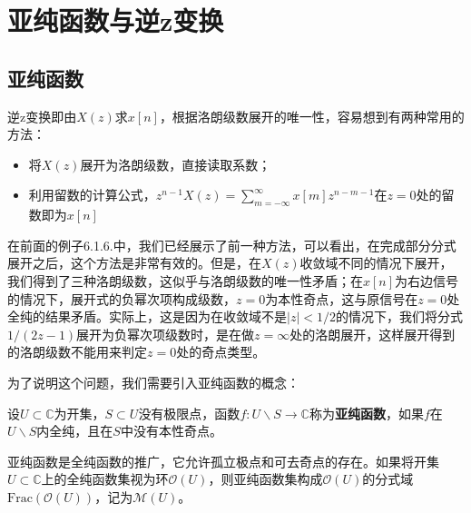 \section{亚纯函数与逆z变换}\label{sec:Inverse_z_Transform}

\subsection{亚纯函数}\label{sub:meromorphic_function}
逆z变换即由$X(z)$求$x[n]$，根据洛朗级数展开的唯一性，容易想到有两种常用的方法：
\begin{itemize}
    \item 将$X(z)$展开为洛朗级数，直接读取系数；
    \item 利用留数的计算公式，$z^{n-1} X(z)=\sum_{m=-\infty}^{\infty} x[m] z^{n-m-1}$在$z=0$处的留数即为$x[n]$
\end{itemize}

在前面的例子6.1.6.中，我们已经展示了前一种方法，可以看出，在完成部分分式展开之后，这个方法是非常有效的。但是，在$X(z)$收敛域不同的情况下展开，我们得到了三种洛朗级数，这似乎与洛朗级数的唯一性矛盾；在$x[n]$为右边信号的情况下，展开式的负幂次项构成级数，$z=0$为本性奇点，这与原信号在$z=0$处全纯的结果矛盾。实际上，这是因为在收敛域不是$|z|<1/2$的情况下，我们将分式$1/(2z-1)$展开为负幂次项级数时，是在做$z=\infty$处的洛朗展开，这样展开得到的洛朗级数不能用来判定$z=0$处的奇点类型。

为了说明这个问题，我们需要引入亚纯函数的概念\cite{Function_Theory}：
\begin{definition}[亚纯函数]
    设$U\subset\mathbb{C}$为开集，$S\subset U$没有极限点，函数$f:U\backslash S\to\mathbb{C}$称为\textbf{亚纯函数}，如果$f$在$U\backslash S$内全纯，且在$S$中没有本性奇点。
\end{definition}

亚纯函数是全纯函数的推广，它允许孤立极点和可去奇点的存在。如果将开集$U\subset \mathbb{C}$上的全纯函数集视为环$\mathcal{O} (U)$，则亚纯函数集构成$\mathcal{O} (U)$的分式域$\text{Frac}(\mathcal{O} (U))$，记为$\mathcal{M} (U)$。

